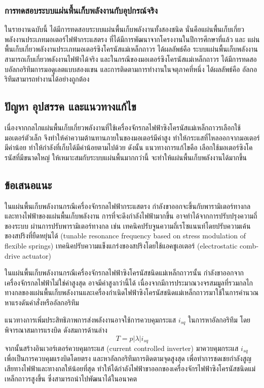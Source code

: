 \documentclass[11pt,a4paper]{article}
\begin{document}
\subsubsection{การทดสอบระบบแผ่นพื้นเก็บพลังงานกับอุปกรณ์จริง}
ในรายงานฉบับนี้ ได้มีการทดสอบระบบแผ่นพื้นเก็บพลังงานทั้งสองชนิด นั่นคือแผ่นพื้นเก็บเกี่ยวพลังงานประเภทมอเตอร์ไฟฟ้ากระแสตรง ที่ได้มีการพัฒนาจากโครงงานในปีการศึกษาที่แล้ว และ แผ่นพื้นเก็บเกี่ยวพลังงานประเภทมอเตอร์ซิงโครนัสแม่เหล็กถาวร ได้ผลลัพธ์คือ ระบบแผ่นพื้นเก็บพลังงาน สามารถเก็บเกี่ยวพลังงานไฟฟ้าได้จริง และในกรณีของมอเตอร์ซิงโครนัสแม่เหล็กถาวร ได้มีการทดสอบอัลกอริทึมการมอดูเลตแบบสองแขน และการติดตามการทำงานในจตุภาคที่หนึ่ง ได้ผลลัพธ์คือ อัลกอริทึมสามารถทำงานได้อย่างถูกต้อง



\subsection{ปัญหา อุปสรรค และแนวทางแก้ไข}
เนื่องจากกลไกแผ่นพื้นเก็บเกี่ยวพลังงานที่ใช้เครื่องจักรกลไฟฟ้าซิงโครนัสแม่เหล็กถาวรเลือกใช้มอเตอร์ตัวเล็ก จึงทำให้ค่าความต้านทานภายในของมอเตอร์มีค่าสูง ทำให้กระแสที่ไหลออกจากมอเตอร์มีค่าน้อย ทำให้กำลังที่เก็บได้มีค่าน้อยตามไปด้วย ดังนั้น แนวทางการแก้ไขคือ เลือกใช้มอเตอร์ซิงโครนัสที่มีขนาดใหญ่ ให้เหมาะสมกับระบบแผ่นพื้นมากกว่านี้ จะทำให้แผ่นพื้นเก็บพลังงานได้มากขึ้น

\subsection{ข้อเสนอแนะ}
ในแผ่นพื้นเก็บพลังงานกรณีเครื่องจักรกลไฟฟ้ากระแสตรง กำลังขาออกจะขึ้นกับพารามิเตอร์ทางกลและทางไฟฟ้าของแผ่นพื้นเก็บพลังงาน การที่จะดึงกำลังไฟฟ้ามากขึ้น อาจทำได้จากการปรับปรุงความถี่ของระบบ ผ่านการปรับพารามิเตอร์ทางกล เช่น เทคนิคปรับจูนความถี่เรโซแนนท์โดยปรับความเค้นของสปริงที่ยืดหยุ่นได้ (tunable resonance frequency based on stress modulation of flexible springs) เทคนิคปรับความแข็งแกร่งของสปริงโดยใช้แอคชูเอเตอร์ (electrostatic comb-drive actuator)

ในแผ่นพื้นเก็บพลังงานกรณีเครื่องจักรกลไฟฟ้าซิงโครนัสชนิดแม่เหล็กถาวรนั้น กำลังขาออกจากเครื่องจักรกลไฟฟ้าไม่ใช่ค่าสูงสุด อาจมีค่าสูงกว่านี้ได้ เนื่องจากมีการประมาณวงจรสมมูลที่รวมกลไกทางกลของแผ่นพื้นเก็บพลังงานและเครื่องกำเนิดไฟฟ้าซิงโครนัสชนิดแม่เหล็กถาวรมาใช้ในการคำนวณหาแรงดันคำสั่งหรืออัลกอริทึม

แนวทางการเพิ่มประสิทธิภาพการส่งพลังงานอาจใช้การควบคุมกระแส $i_{sq}$ ในการหาอัลกอริทึม โดยพิจารณาสมการแรงบิด ดังสมการด้านล่าง
\begin{equation}
    T = p|\lambda|i_{sq}
\end{equation}
จากนั้นสร้างอินเวอร์เตอร์ควบคุมกระแส (current controlled inverter) มาควบคุมกระแส $i_{sq}$ เพื่อเป็นการควบคุมแรงบิดโดยตรง และหาอัลกอริทึมการติดตามจุดสูงสุด เพื่อทำการชดเชยกำลังสูญเสียทางไฟฟ้าและทางกลให้น้อยที่สุด ทำให้ได้กำลังไฟฟ้าขาออกของเครื่องจักรไฟฟ้าซิงโครนัสชนิดแม่เหล็กถาวรสูงขึ้น ซึ่งสามารถนำไปพัฒนาได้ในอนาคต
\end{document}

